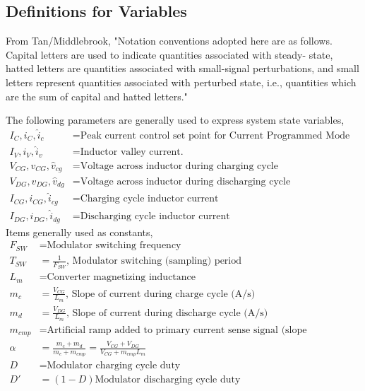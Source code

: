 \documentclass{scrartcl}
\begin{document}
		\subsection{Definitions for Variables}
		
		From Tan/Middlebrook, "Notation conventions adopted here  are  as  follows.  Capital letters are used  to indicate quantities associated with steady- state, hatted letters are quantities associated with small-signal perturbations, and small letters represent quantities associated with perturbed state,  i.e.,  quantities which are  the sum of capital and  hatted letters."
			
		The following parameters are generally used to express system state variables,
			\begin{align*}
			I_C, i_C, \hat{i}_c &= \text{Peak current control set point for Current Programmed Mode (CPM) control}\\
			I_V, i_V, \hat{i}_v &= \text{Inductor valley current.} \\
			V_{CG},v_{CG},\hat{v}_{cg} &= \text{Voltage across inductor during charging cycle} \\
			V_{DG},v_{DG},\hat{v}_{dg}  &= \text{Voltage across inductor during discharging cycle} \\
			I_{CG}, i_{CG}, \hat{i}_{cg} &= \text{Charging cycle inductor current} \\
			I_{DG}, i_{DG}, \hat{i}_{dg} &= \text{Discharging cycle inductor current}
			\end{align*}
			Items generally used as constants,
			\begin{align*}	
			F_{SW} &= \text{Modulator switching frequency}\\
			T_{SW} &= \frac{1}{F_{SW}}\text{, Modulator switching (sampling) period} \\
			L_m &= \text{Converter magnetizing inductance} \\
			m_c &= \frac{V_{CG}} {L_m}\text{, Slope of current during charge cycle (A/s)} \\
			m_d &= \frac{V_{DG}} {L_m}\text{, Slope of current during discharge cycle (A/s)}\\
			m_{cmp} &= \text{Artificial ramp added to primary current sense signal (slope compensation) (A/s)}\\
			\alpha &= \frac{m_c + m_d} {m_c + m_{cmp}} =  \frac{V_{CG} + V_{DG}} {V_{CG} + m_{cmp} L_m}\\
			D &= \text{Modulator charging cycle duty} \\
			D' &= (1-D) \text{Modulator discharging cycle duty}\\	
			\end{align*}
			
\end{document}

